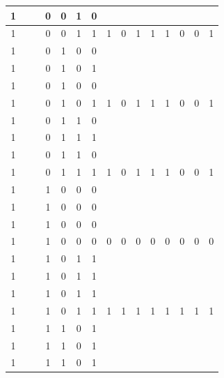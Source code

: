 \begin{table}[!tb]
\begin{tabular}{|c|c|c|c|c|c|c|c|c|c|c|c|c|c|c|}
        \rowcolor{yellow!40} 1 &  &  & 0 & 0 & 1 & 0 &  &  &  &  &  &  &  &  \\ \hline
        \rowcolor{yellow!40} 1 &  &  & 0 & 0 & 1 & 1 & 1 & 0 & 1 & 1 & 1 & 0 & 0 & 1 \\ \hline
        \rowcolor{gray!40} 1 &  &  & 0 & 1 & 0 & 0 &  &  &  &  &  &  &  &  \\ \hline
        \rowcolor{gray!40} 1 &  &  & 0 & 1 & 0 & 1 &  &  &  &  &  &  &  &  \\ \hline
        \rowcolor{gray!40} 1 &  &  & 0 & 1 & 0 & 0 &  &  &  &  &  &  &  &  \\ \hline
        \rowcolor{gray!40} 1 &  &  & 0 & 1 & 0 & 1 & 1 & 0 & 1 & 1 & 1 & 0 & 0 & 1 \\ \hline
        \rowcolor{blue!40} 1 &  &  & 0 & 1 & 1 & 0 &  &  &  &  &  &  &  &  \\ \hline
        \rowcolor{blue!40} 1 &  &  & 0 & 1 & 1 & 1 &  &  &  &  &  &  &  &  \\ \hline
        \rowcolor{blue!40} 1 &  &  & 0 & 1 & 1 & 0 &  &  &  &  &  &  &  &  \\ \hline
        \rowcolor{blue!40} 1 &  &  & 0 & 1 & 1 & 1 & 1 & 0 & 1 & 1 & 1 & 0 & 0 & 1 \\ \hline
        \rowcolor{red!40} 1 &  &  & 1 & 0 & 0 & 0 &  &  &  &  &  &  &  &  \\ \hline
        \rowcolor{red!40} 1 &  &  & 1 & 0 & 0 & 0 &  &  &  &  &  &  &  &  \\ \hline
        \rowcolor{red!40} 1 &  &  & 1 & 0 & 0 & 0 &  &  &  &  &  &  &  &  \\ \hline
        \rowcolor{red!40} 1 &  &  & 1 & 0 & 0 & 0 & 0 & 0 & 0 & 0 & 0 & 0 & 0 & 0 \\ \hline
        \rowcolor{green!40} 1 &  &  & 1 & 0 & 1 & 1 &  &  &  &  &  &  &  &  \\ \hline
        \rowcolor{green!40} 1 &  &  & 1 & 0 & 1 & 1 &  &  &  &  &  &  &  &  \\ \hline
        \rowcolor{green!40} 1 &  &  & 1 & 0 & 1 & 1 &  &  &  &  &  &  &  &  \\ \hline
        \rowcolor{green!40} 1 &  &  & 1 & 0 & 1 & 1 & 1 & 1 & 1 & 1 & 1 & 1 & 1 & 1 \\ \hline
        \rowcolor{yellow!40} 1 &  &  & 1 & 1 & 0 & 1 &  &  &  &  &  &  &  &  \\ \hline
        \rowcolor{yellow!40} 1 &  &  & 1 & 1 & 0 & 1 &  &  &  &  &  &  &  &  \\ \hline
        \rowcolor{yellow!40} 1 &  &  & 1 & 1 & 0 & 1 &  &  &  &  &  &  &  &  \\ \hline

\end{tabular}
\end{table}
